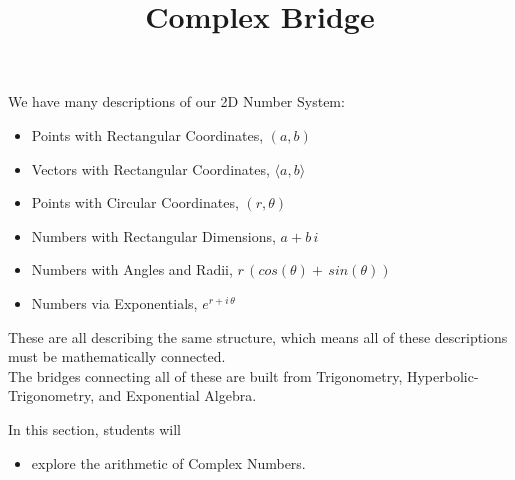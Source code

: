 \documentclass{ximera}
\title{Complex Bridge}
\begin{document}
\begin{abstract}
\end{abstract}
\maketitle




We have many descriptions of our 2D Number System:

\begin{itemize}
\item Points with Rectangular Coordinates, $(a,b)$
\item Vectors with Rectangular Coordinates, $\langle a, b \rangle$
\item Points with Circular Coordinates, $(r,\theta)$
\item Numbers with Rectangular Dimensions, $a + b \, i$
\item Numbers with Angles and Radii, $r \, (cos(\theta) + \, sin(\theta))$
\item Numbers via Exponentials, $e^{r + i \, \theta}$
\end{itemize}

These are all describing the same structure, which means all of these descriptions must be mathematically connected. \\


The bridges connecting all of these are built from Trigonometry, Hyperbolic-Trigonometry, and Exponential Algebra.







\begin{sectionOutcomes}
In this section, students will 

\begin{itemize}
\item explore the arithmetic of Complex Numbers.
\end{itemize}
\end{sectionOutcomes}
\end{document}
